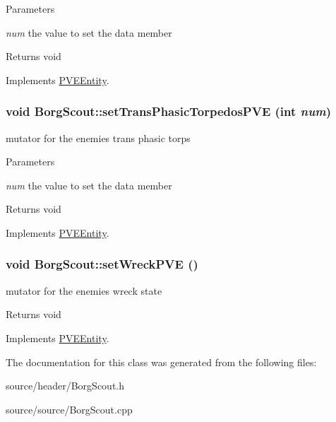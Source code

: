 \begin{DoxyParams}{Parameters}
\item[{\em num}]the value to set the data member\end{DoxyParams}
\begin{DoxyReturn}{Returns}
void 
\end{DoxyReturn}


Implements \hyperlink{classPVEEntity}{PVEEntity}.

\hypertarget{classBorgScout_aee2837e76125a16bdd56ff967902e99f}{
\subsubsection[{setTransPhasicTorpedosPVE}]{\setlength{\rightskip}{0pt plus 5cm}void BorgScout::setTransPhasicTorpedosPVE (int {\em num})}}
\label{d5/d8c/classBorgScout_aee2837e76125a16bdd56ff967902e99f}
mutator for the enemies trans phasic torps


\begin{DoxyParams}{Parameters}
\item[{\em num}]the value to set the data member\end{DoxyParams}
\begin{DoxyReturn}{Returns}
void 
\end{DoxyReturn}


Implements \hyperlink{classPVEEntity}{PVEEntity}.

\hypertarget{classBorgScout_ad387c5b9ea86f8e53f6f5ab4cf83bb42}{
\subsubsection[{setWreckPVE}]{\setlength{\rightskip}{0pt plus 5cm}void BorgScout::setWreckPVE ()}}
\label{d5/d8c/classBorgScout_ad387c5b9ea86f8e53f6f5ab4cf83bb42}
mutator for the enemies wreck state

\begin{DoxyReturn}{Returns}
void 
\end{DoxyReturn}


Implements \hyperlink{classPVEEntity}{PVEEntity}.



The documentation for this class was generated from the following files:\begin{DoxyCompactItemize}
\item 
source/header/BorgScout.h\item 
source/source/BorgScout.cpp\end{DoxyCompactItemize}
